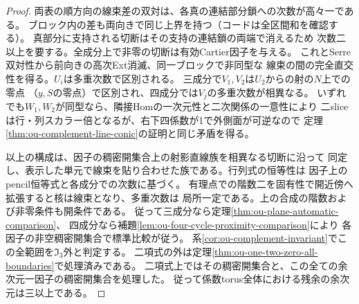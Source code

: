 \begin{proof}
両表の順方向の線束差の双対は、各真の連結部分鎖への次数が高々一である。
ブロック内の差も両向きで同じ上界を持つ（コードは全区間和を確認する）。
真部分に支持される切断はその支持の連結鎖の両端で消えるため
次数二以上を要する。全成分上で非零の切断は有効Cartier因子を与える。
これとSerre双対性から前向きの高次Ext消滅、同一ブロックで非同型な
線束の間の完全直交性を得る。$U_i$は多重次数で区別される。
三成分で$V_1,V_2$は$U_2$からの射の$N$上での零点
（$y,S$の零点）で区別され、四成分では$V_j$の多重次数が相異なる。
いずれでも$W_1,W_2$が同型なら、隣接Homの一次元性と二次関係の一意性により
二sliceは行・列スカラー倍となるが、右下四係数が1で外側面が可逆なので
定理\ref{thm:ou-complement-line-conic}の証明と同じ矛盾を得る。

以上の構成は、因子の稠密開集合上の射影直線族を相異なる切断に沿って
同定し、表示した単元で線束を貼り合わせた族である。行列式の恒等性は
因子上のpencil恒等式と各成分での次数に基づく。
有理点での階数二を固有性で開近傍へ拡張すると核は線束となり、多重次数は
局所一定である。上の合成の階数および非零条件も開条件である。
従って三成分なら定理\ref{thm:ou-plane-automatic-comparison}、
四成分なら補題\ref{lem:ou-four-cycle-proximity-comparison}により
各因子の非空稠密開集合で標準比較が従う。
系\ref{cor:ou-complement-invariant}でこの全範囲を$\mathfrak I_3$外と判定する。
二項式の外は定理\ref{thm:ou-one-two-zero-all-boundaries}で処理済みである。
二項式上ではその稠密開集合と、この全ての余次元一因子の稠密開集合を処理した。
従って係数torus全体における残余の余次元は三以上である。
\end{proof}

